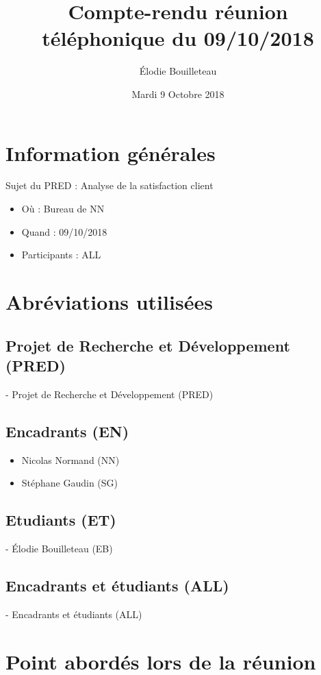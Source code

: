\documentclass[11pt]{report}
\title{Compte-rendu réunion téléphonique du 09/10/2018}
\author{Élodie Bouilleteau}
\date{Mardi 9 Octobre 2018}
\begin{document}
\maketitle
\renewcommand{\thesection}{\arabic{section}} 
\section{Information générales}
Sujet du PRED : Analyse de la satisfaction client
\\
	\begin{itemize}
		\item Où : Bureau de NN
		\item Quand : 09/10/2018
		\item Participants : ALL
	\end{itemize}

\section{Abréviations utilisées}

\subsection{Projet de Recherche et Développement (PRED)}
- Projet de Recherche et Développement (PRED)

\subsection{Encadrants (EN)}
 	\begin{itemize}
		\item Nicolas Normand (NN)
		\item Stéphane Gaudin (SG)
	\end{itemize}
    
\subsection{Etudiants (ET)}
- Élodie Bouilleteau (EB)

\subsection{Encadrants et étudiants (ALL)}
- Encadrants et étudiants (ALL)

\newpage

\section{Point abordés lors de la réunion}
\end{document}
